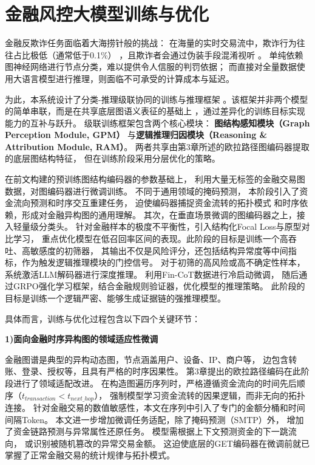 \section{金融风控大模型训练与优化}

金融反欺诈任务面临着大海捞针般的挑战：
在海量的实时交易流中，欺诈行为往往占比极低（通常低于0.1\%）
，且欺诈者会通过伪装手段混淆视听 。
单纯依赖图神经网络进行节点分类，难以提供令人信服的判罚依据；
而直接对全量数据使用大语言模型进行推理，则面临不可承受的计算成本与延迟。   

为此，本系统设计了分类-推理级联协同的训练与推理框架
。该框架并非两个模型的简单串联，而是在共享底层图语义表征的基础上
，通过差异化的训练目标实现能力的互补与跃升。
级联训练框架包含两个核心模块：
\textbf{图结构感知模块（Graph Perception Module, GPM）}
与\textbf{逻辑推理归因模块（Reasoning \& Attribution Module, RAM）}。
两者共享由第3章所述的欧拉路径图编码器提取的底层图结构特征，
但在训练阶段采用分层优化的策略。

在前文构建的预训练图结构编码器的参数基础上，
利用大量无标签的金融交易图数据，对图编码器进行微调训练。
不同于通用领域的掩码预测，
本阶段引入了资金流向预测和时序交互重建任务，
迫使编码器捕捉资金流转的拓扑模式
和时序依赖，形成对金融异构图的通用理解。
其次，在垂直场景微调的图编码器之上，接入轻量级分类头。
针对金融样本的极度不平衡性，引入结构化Focal Loss与原型对比学习，
重点优化模型在低召回率区间的表现。此阶段的目标是训练一个高吞吐、高敏感度的初筛器，
其输出不仅是风险评分，还包括结构异常度等中间指标，作为触发逻辑推理模块的门控信号。
对于初筛的高风险或高不确定性样本，
系统激活LLM解码器进行深度推理。
利用Fin-CoT数据进行冷启动微调，
随后通过GRPO强化学习框架，结合金融规则验证器，优化模型的推理策略。
此阶段的目标是训练一个逻辑严密、能够生成证据链的强推理模型。

具体而言，训练与优化过程包含以下四个关键环节：

\textbf{1)面向金融时序异构图的领域适应性微调}

金融图谱是典型的异构动态图，节点涵盖用户、设备、IP、商户等，
边包含转账、登录、授权等，且具有严格的时序因果性。
第3章提出的欧拉路径编码在此阶段进行了领域适配改进。
在构造图遍历序列时，严格遵循资金流向的时间先后顺序（$t_{transaction} < t_{next\_hop}$），
强制模型学习资金流转的因果逻辑，而非无向的拓扑连接。
针对金融交易的数值敏感性，本文在序列中引入了专门的金额分桶和时间间隔Token。
本文进一步增加微调任务适配，除了掩码预测（SMTP）外，
增加了资金链路预测与异常属性还原任务。
模型需根据上下文预测资金的下一跳流向，
或识别被随机篡改的异常交易金额。
这迫使底层的GET编码器在微调前就已掌握了正常金融交易的统计规律与拓扑模式。

